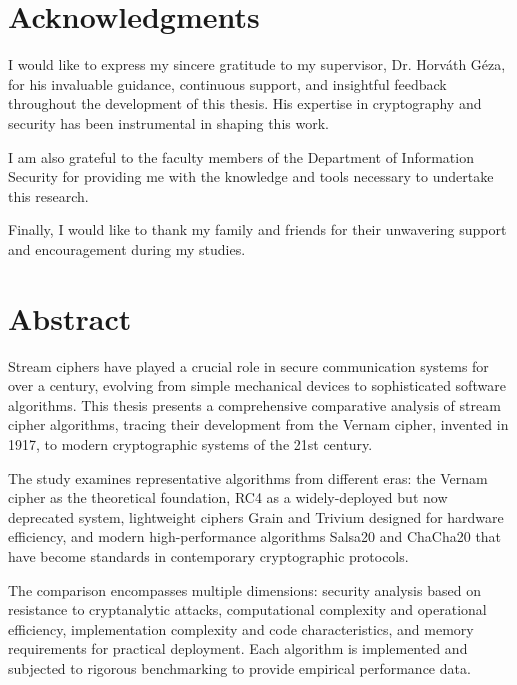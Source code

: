 \documentclass[12pt,a4paper,oneside]{report}
\begin{document}
\cleardoublepage

\chapter*{Acknowledgments}

I would like to express my sincere gratitude to my supervisor, Dr. Horváth Géza, for his invaluable guidance, continuous support, and insightful feedback throughout the development of this thesis. His expertise in cryptography and security has been instrumental in shaping this work.

I am also grateful to the faculty members of the Department of Information Security for providing me with the knowledge and tools necessary to undertake this research.

Finally, I would like to thank my family and friends for their unwavering support and encouragement during my studies.

\cleardoublepage

\chapter*{Abstract}

Stream ciphers have played a crucial role in secure communication systems for over a century, evolving from simple mechanical devices to sophisticated software algorithms. This thesis presents a comprehensive comparative analysis of stream cipher algorithms, tracing their development from the Vernam cipher, invented in 1917, to modern cryptographic systems of the 21st century.

The study examines representative algorithms from different eras: the Vernam cipher as the theoretical foundation, RC4 as a widely-deployed but now deprecated system, lightweight ciphers Grain and Trivium designed for hardware efficiency, and modern high-performance algorithms Salsa20 and ChaCha20 that have become standards in contemporary cryptographic protocols.

The comparison encompasses multiple dimensions: security analysis based on resistance to cryptanalytic attacks, computational complexity and operational efficiency, implementation complexity and code characteristics, and memory requirements for practical deployment. Each algorithm is implemented and subjected to rigorous benchmarking to provide empirical performance data.
\end{document}
